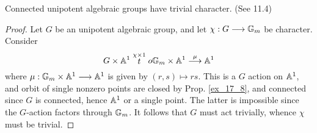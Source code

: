 \begin{cor}
Connected unipotent algebraic groups have trivial character. 
(See 11.4)
\end{cor}
\begin{proof}
Let $G$ be an unipotent algebraic group, and let $\chi: G \longrightarrow
\mathbb{G}_m$ be character. Consider
\[
G \times \mathbb{A}^1 \stackrel{\chi \times 1} to \mathbb{G}_m \times \mathbb{A}^1 
\stackrel{ \mu}{\longrightarrow} \mathbb{A}^1
\]
where $\mu: \mathbb{G}_m \times \mathbb{A}^1 \longrightarrow \mathbb{A}^1$ is given by $(r,s) \mapsto 
rs$. This is a $G$ action on $\mathbb{A}^1$, and orbit of single nonzero
points are closed by Prop. \ref{ex_17_8}, and connected since $G$
is connected, hence $\mathbb{A}^1$ or a single point. The latter is impossible
since the $G$-action factors through $\mathbb{G}_m$. It follows that $G$ must
act trivially, whence $\chi$ must be trivial.
\end{proof}
